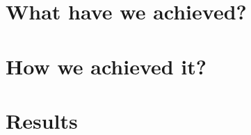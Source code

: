 \documentclass{beamer}
\begin{document}
\begin{frame}
	\frametitle{}
	
\end{frame}


\section{What have we achieved?} %

\begin{frame}
	\frametitle{}
	
\end{frame}


\section{How we achieved it?} %

\begin{frame}
	\frametitle{}
	
\end{frame}


\section{Results} %

\begin{frame}
	\frametitle{}
	
\end{frame}
\end{document}
